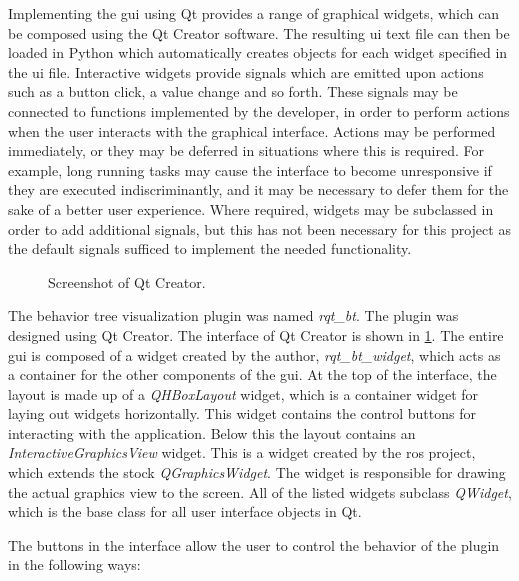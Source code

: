 \documentclass[\rootfolder/main.tex]{subfiles}
\begin{document}
Implementing the \acrshort{gui} using Qt provides a range of graphical widgets, which can be composed using the Qt Creator software.
The resulting \acrshort{ui} text file can then be loaded in Python which automatically creates objects for each widget specified in the \acrshort{ui} file.
Interactive widgets provide signals which are emitted upon actions such as a button click, a value change and so forth.
These signals may be connected to functions implemented by the developer, in order to perform actions when the user interacts with the graphical interface.
Actions may be performed immediately, or they may be deferred in situations where this is required.
For example, long running tasks may cause the interface to become unresponsive if they are executed indiscriminantly, and it may be necessary to defer them for the sake of a better user experience.
Where required, widgets may be subclassed in order to add additional signals, but this has not been necessary for this project as the default signals sufficed to implement the needed functionality.

\begin{figure}[ht]
    \caption{Screenshot of Qt Creator.}
    \label{fig:qt-creator}
\end{figure}

The behavior tree visualization plugin was named \emph{rqt\_bt}.
The plugin was designed using Qt Creator.
The interface of Qt Creator is shown in \cref{fig:qt-creator}.
The entire \acrshort{gui} is composed of a widget created by the author, \emph{rqt\_bt\_widget}, which acts as a container for the other components of the \acrshort{gui}.
At the top of the interface, the layout is made up of a \emph{QHBoxLayout} widget, which is a container widget for laying out widgets horizontally.
This widget contains the control buttons for interacting with the application.
Below this the layout contains an \emph{InteractiveGraphicsView} widget.
This is a widget created by the \acrshort{ros} project, which extends the stock \emph{QGraphicsWidget}.
The widget is responsible for drawing the actual graphics view to the screen.
All of the listed widgets subclass \emph{QWidget}, which is the base class for all user interface objects in Qt.

The buttons in the interface allow the user to control the behavior of the plugin in the following ways:
\end{document}
